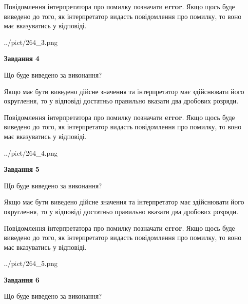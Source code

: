 \documentclass[12pt, ukrainian]{article}
\begin{document}
{\begin {Large}
Повідомлення інтерпретатора про помилку позначати \textbf{error}.
Якщо щось буде виведено до того, як інтерпретатор видасть повідомлення про помилку, 
то воно має вказуватись у відповіді. \par

\begin{center}
	{../pict/264_3.png}
\end{center}
\newpage

{\begin {center}\textbf{Завдання 4}\end {center}}\par
Що буде виведено за виконання? \par

Якщо має бути виведено дійсне значення та інтерпретатор має здійснювати його округлення, 
то у відповіді достатньо правильно вказати два дробових розряди.

Повідомлення інтерпретатора про помилку позначати \textbf{error}.
Якщо щось буде виведено до того, як інтерпретатор видасть повідомлення про помилку, 
то воно має вказуватись у відповіді. \par

\begin{center}
	{../pict/264_4.png}
\end{center}
\newpage

{\begin {center}\textbf{Завдання 5}\end {center}}\par
Що буде виведено за виконання? \par

Якщо має бути виведено дійсне значення та інтерпретатор має здійснювати його округлення, 
то у відповіді достатньо правильно вказати два дробових розряди.

Повідомлення інтерпретатора про помилку позначати \textbf{error}.
Якщо щось буде виведено до того, як інтерпретатор видасть повідомлення про помилку, 
то воно має вказуватись у відповіді. \par

\begin{center}
	{../pict/264_5.png}
\end{center}
\newpage

{\begin {center}\textbf{Завдання 6}\end {center}}\par
Що буде виведено за виконання? \par


\end{Large}}
\end{document}
